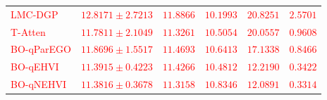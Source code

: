 \documentclass[11pt]{article}
\begin{document}
\begin{table}[!htbp]
\begin{tabular*}{\textwidth}{@{\extracolsep{\fill}}lccccc}
		\textcolor{red}{LMC-DGP}%
		                       & \textcolor{red}{$12.8171 \pm 2.7213$}%
		                       & \textcolor{red}{$11.8866$} & \textcolor{red}{$10.1993$} & \textcolor{red}{$20.8251$} & \textcolor{red}{$2.5701$} \\
		\textcolor{red}{T-Atten}%
		                       & \textcolor{red}{$11.7811 \pm 2.1049$}%
		                       & \textcolor{red}{$11.3261$} & \textcolor{red}{$10.5054$} & \textcolor{red}{$20.0557$} & \textcolor{red}{$0.9608$} \\
		\midrule
		\textcolor{red}{BO-qParEGO}%
		                       & \textcolor{red}{$11.8696 \pm 1.5517$}%
		                       & \textcolor{red}{$11.4693$} & \textcolor{red}{$10.6413$} & \textcolor{red}{$17.1338$} & \textcolor{red}{$0.8466$} \\
		\textcolor{red}{BO-qEHVI}%
		                       & \textcolor{red}{$11.3915 \pm 0.4223$}%
		                       & \textcolor{red}{$11.4266$} & \textcolor{red}{$10.4812$} & \textcolor{red}{$12.2190$} & \textcolor{red}{$0.3422$} \\
		\textcolor{red}{BO-qNEHVI}%
		                       & \textcolor{red}{$11.3816 \pm 0.3678$}%
		                       & \textcolor{red}{$11.3158$} & \textcolor{red}{$10.8346$} & \textcolor{red}{$12.0891$} & \textcolor{red}{$0.3314$} \\
		\bottomrule
	\end{tabular*}
\end{table}
\vspace{-0.5em}
\end{document}
